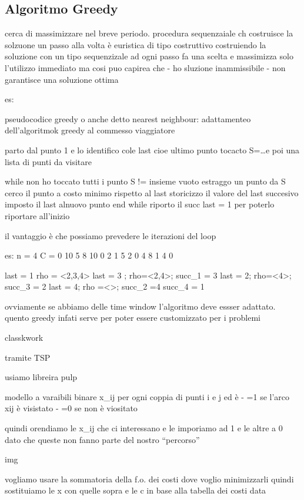\subsection{Algoritmo Greedy}

cerca di massimizzare nel breve periodo. procedura sequenzaiale ch costruisce la solzuone un  passo alla volta 
è euristica di tipo costruttivo costruiendo la soluzione con un tipo sequenzizale ad ogni passo fa una scelta e massimizza solo l’utilizzo immediato ma cosi puo capirea che
- ho sluzione inammissibile
- non garantisce una soluzione ottima

es: 

pseudocodice greedy o anche detto nearest neighbour: adattamenteo dell’algoritmok greedy al commesso viaggiatore

parto dal punto 1 e lo identifico cole last cioe ultimo punto tocacto 
S={…}e poi una lista di punti da visitare

while non ho toccato tutti i punto S != insieme vuoto
estraggo un punto da S
cerco il punto a costo minimo rispetto al last 
storicizzo il valore del last succesivo
imposto il last alnuovo punto 
end while
riporto il succ last = 1 per poterlo riportare all’inizio


il vantaggio è che possiamo prevedere le iterazioni del loop 

es:
n = 4
C = 
0 10 5 8
10 0 2 1 
5 2 0 4
8 1 4 0

last = 1 rho = <2,3,4>
last = 3 ; rho=<2,4>; succ_1 = 3
last = 2; rho=<4>; succ_3 = 2
last = 4; rho =<>; succ_2 =4
succ_4 = 1

ovviamente se abbiamo delle time window l’algoritmo deve essser adattato. quento greedy infati serve per poter essere customizzato per i problemi




classkwork

tramite TSP

usiamo libreira pulp


modello a varaibili binare x_{ij} per ogni coppia di punti i e j ed è 
- =1 se l’arco x{ij} è visistato
- =0 se non è viositato

quindi orendiamo le x_{ij} che ci interessano e le imporiamo ad 1 e le altre a 0 dato che queste non fanno parte del nostro “percorso”

img

vogliamo usare la sommatoria {della f.o. }dei costi  dove voglio minimizzarli quindi sostituiamo le x con quelle sopra e le c in base alla tabella dei costi data

